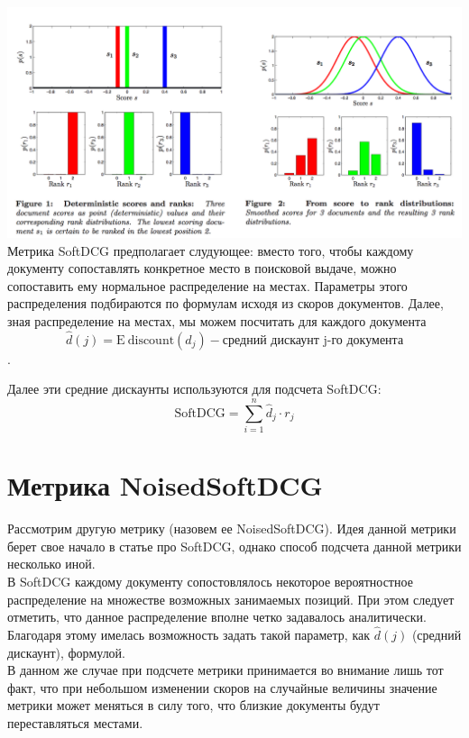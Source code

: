 \documentclass[12pt,a4paper]{amsart}
\theoremstyle{definition}
\theoremstyle{definition}
\newcommand{\E}{\mathrm{E}}
\newcommand{\Sum}{\sum\limits}
\renewcommand\t{\text}
\begin{document}
\hspace*{-0.7cm}\includegraphics[width=0.85\paperwidth]{SoftDCG} \\

Метрика SoftDCG предполагает слудующее: вместо того, чтобы каждому документу сопоставлять конкретное место в поисковой выдаче, можно сопоставить ему нормальное распределение на местах. Параметры этого распределения подбираются по формулам исходя из скоров документов. Далее, зная распределение на местах, мы можем посчитать для каждого документа $$\hat{d}(j) = \E ~ \t{discount}(d_j) - \t{средний дискаунт j-го документа}$$.

Далее эти средние дискаунты используются для подсчета SoftDCG: $$\t{SoftDCG} = \Sum_{i=1}^n \hat{d}_j \cdot r_j$$


\newpage
\section{Метрика NoisedSoftDCG}

Рассмотрим другую метрику (назовем ее NoisedSoftDCG). Идея данной метрики берет свое начало в статье про SoftDCG, однако способ подсчета данной метрики несколько иной. \\

В SoftDCG каждому документу сопостовлялось некоторое вероятностное распределение на множестве возможных занимаемых позиций. При этом следует отметить, что данное распределение вполне четко задавалось аналитически. Благодаря этому имелась возможность задать такой параметр, как $\hat{d}(j)$ (средний дискаунт), формулой. \\

В данном же случае при подсчете метрики принимается во внимание лишь тот факт, что при небольшом изменении скоров на случайные величины значение метрики может меняться в силу того, что близкие документы будут переставляться местами. \\
\end{document}
